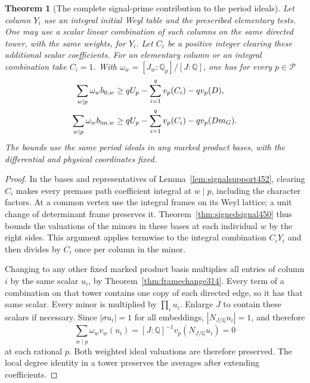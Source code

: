 \documentclass[a4paper,11pt]{article}
\newtheorem{theorem}[proposition]{Theorem}
\theoremstyle{definition}
\theoremstyle{remark}
\numberwithin{equation}{section}
\begin{document}
\begin{theorem}[The complete signal-prime contribution to the period ideals]\leavevmode
\label{thm:fullsignal452}
Let column \(Y_i\) use an integral initial Weyl table and the
prescribed elementary tests. One may use a scalar linear
combination of such columns on the same directed tower, with
the same weights, for \(Y_i\). Let \(C_i\) be a positive integer
clearing these additional scalar coefficients. For an elementary
column or an integral combination take \(C_i=1\). With
\(\omega_w=[J_w:\mathbb Q_p]/[J:\mathbb Q]\), one has for
every \(p\in\mathcal P\)
\[
 \begin{aligned}
 \sum_{w\mid p}\omega_w b_{0,w}
      &\ge q U_p-\sum_{i=1}^{q}v_p(C_i)-qv_p(D),\\
 \sum_{w\mid p}\omega_w b_{{\rm im},w}
      &\ge q U_p-\sum_{i=1}^{q}v_p(C_i)-qv_p(Dm_G).
 \end{aligned}
\]
The bounds use the same period ideals in any marked product
bases, with the differential and physical coordinates fixed.
\end{theorem}
\begin{proof}
In the bases and representatives of Lemma~\ref{lem:signalsupport452},
clearing \(C_i\) makes every premass path coefficient integral
at \(w\mid p\), including the character factors. At a common
vertex use the integral frames on its Weyl lattice; a unit
change of determinant frame preserves it. Theorem~\ref{thm:signedsignal450}
thus bounds the valuations of the minors in these bases at each
individual \(w\) by the right sides. This argument applies
termwise to the integral combination \(C_iY_i\) and then divides
by \(C_i\) once per column in the minor.

Changing to any other fixed marked product basis multiplies all
entries of column \(i\) by the same scalar \(u_i\), by
Theorem~\ref{thm:framechange314}. Every term of a combination
on that tower contains one copy of each directed edge, so it
has that same scalar. Every minor is multiplied by
\(\prod_i u_i\). Enlarge \(J\) to contain these scalars if
necessary. Since \(|\sigma u_i|=1\) for all embeddings,
\(|N_{J/\mathbb Q}u_i|=1\), and therefore
\[
 \sum_{w\mid p}\omega_w v_w(u_i)
       =[J:\mathbb Q]^{-1}v_p(N_{J/\mathbb Q}u_i)=0
\]
at each rational \(p\). Both weighted ideal valuations are
therefore preserved. The local degree identity in a tower
preserves the averages after extending coefficients.
\end{proof}
\end{document}
